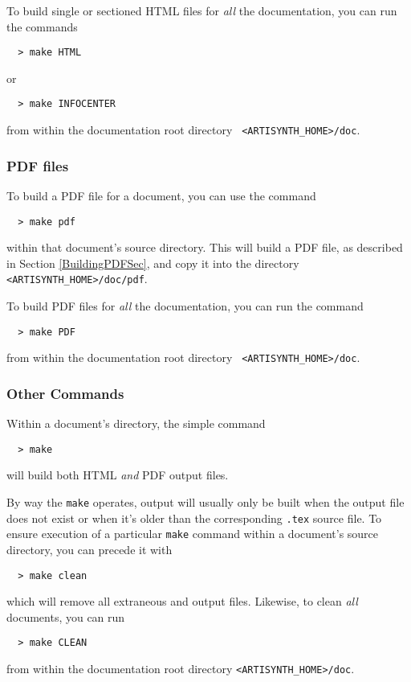 \documentclass{article}
\begin{document}
To build single or sectioned HTML files for {\it all} the
documentation, you can run the commands
%
\begin{verbatim}
  > make HTML
\end{verbatim}
%
or
%
\begin{verbatim}
  > make INFOCENTER
\end{verbatim}
%
from within the documentation root directory {\tt
<ARTISYNTH\_HOME>/doc}.

\subsubsection{PDF files}
\label{MakingPDFSec}

To build a PDF file for a document, you can use the command
%
\begin{verbatim}
  > make pdf
\end{verbatim}
%
within that document's source directory. This will build a PDF file,
as described in Section \ref{BuildingPDFSec}, and copy it into the directory 
{\tt <ARTISYNTH\_HOME>/doc/pdf}.

To build PDF files for {\it all} the documentation, you can run the
command
%
\begin{verbatim}
  > make PDF
\end{verbatim}
%
from within the documentation root directory {\tt
<ARTISYNTH\_HOME>/doc}.

\subsubsection{Other Commands}

Within a document's directory, the simple command
%
\begin{verbatim}
  > make
\end{verbatim}
%
will build both HTML {\it and} PDF output files.

By way the {\tt make} operates, output will usually only be built when
the output file does not exist or when it's older than the
corresponding {\tt .tex} source file. To ensure execution of a particular
{\tt make} command within a document's source directory,
you can precede it with
%
\begin{verbatim}
  > make clean
\end{verbatim}
%
which will remove all extraneous and output files. Likewise,
to clean {\it all} documents, you can run 
%
\begin{verbatim}
  > make CLEAN
\end{verbatim}
%
from within the documentation root directory {\tt <ARTISYNTH\_HOME>/doc}.
\end{document}
